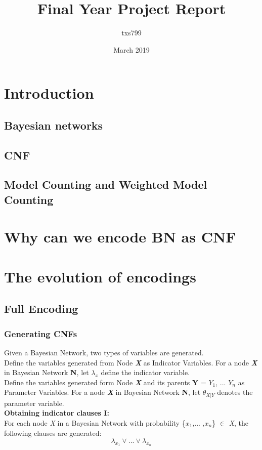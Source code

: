 \documentclass{article}
\title{Final Year Project Report}
\author{txs799 }
\date{March 2019}
\begin{document}
\maketitle

\section{Introduction}
\subsection{Bayesian networks}
\subsection{CNF}
\subsection{Model Counting and Weighted Model Counting}

\section{Why can we encode BN as CNF}

\section{The evolution of encodings}
\subsection{Full Encoding}
\subsubsection{Generating CNFs}
Given a Bayesian Network, two types of variables are generated.\\
Define the variables generated from Node \textbf{\textit{X}} as Indicator Variables.
For a node \textbf{\textit{X}} in Bayesian Network \textbf{N}, let $\lambda_x$ define the indicator variable. \\
Define the variables generated form Node \textbf{\textit{X}} and its parents \textbf{Y} = {$Y_{1}$, ... $Y_{n}$} as Parameter Variables.
For a node \textbf{\textit{X}} in Bayesian Network \textbf{N}, let $\theta_{X|Y}$ denotes the parameter variable.\\
\textbf{Obtaining indicator clauses \textsc{I}:}\\
For each node \textit{X} in a Bayesian Network with probability \{$x_{1}$,... ,$x_{n}$\} $\in$ \textit{X}, the following clauses are generated:
\begin{equation}\label{fullenc_ic1}
    \lambda_{x_{1}} \vee ... \vee \lambda_{x_{n}}
\end{equation}
\end{document}
